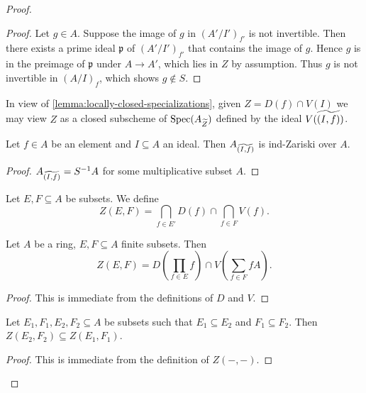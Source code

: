 \begin{proof}
\begin{proof}
    Let $g \in A$. Suppose the image of $g$ in $(A' / I')_{f'}$ is not invertible.
    Then there exists a prime ideal $\mathfrak{p}$ of $(A' / I')_{f'}$ that contains the image of $g$.
    Hence $g$ is in the preimage of $\mathfrak{p}$ under $A \to A'$, which lies in $Z$ by assumption. Thus
    $g$ is not invertible in $(A / I)_f$, which shows $g \not\in S$.
\end{proof}

In view of \ref{lemma:locally-closed-specializations}, given $Z = D(f) \cap V(I)$ we may
view $Z$ as a closed subscheme of $\mathrm{Spec}(A_{\widetilde{Z}})$ defined by the ideal
$V( \widetilde{(I, f)})$.

\begin{lemma}
    Let $f \in A$ be an element and $I \subseteq A$ an ideal. Then
    $A_{\widetilde{(I, f)}}$ is ind-Zariski over $A$.
    \label{lemma:tilde-locclosed-ind-zariski}
\end{lemma}

\begin{proof}
    $A_{\widetilde{(I, f)}} = S^{-1} A$ for some multiplicative subset $A$.
\end{proof}

\begin{definition}
    Let $E, F \subseteq A$ be subsets. We define
    \[
    Z(E, F) = \bigcap_{f \in E'} D(f) \cap \bigcap_{f \in F} V(f)
    .\]
    \label{def:subset-stratum}
\end{definition}

\begin{lemma}
    Let $A$ be a ring, $E, F \subseteq A$ finite subsets. Then
    \[
    Z(E, F) = D\left( \prod_{f \in E}  f \right) \cap V\left( \sum_{f \in F} fA \right)
    .\]
    \label{lemma:subset-stratum-equals-inter}
\end{lemma}

\begin{proof}
    This is immediate from the definitions of $D$ and $V$.
\end{proof}

\begin{lemma}
    Let $E_1, F_1, E_2, F_2 \subseteq A$ be subsets such that $E_1 \subseteq E_2$ and
    $F_1 \subseteq F_2$. Then $Z(E_2, F_2) \subseteq Z(E_1, F_1)$.
    \label{lemma:subset-stratum-mono}
\end{lemma}

\begin{proof}
    This is immediate from the definition of $Z(-, -)$.
\end{proof}


\end{proof}
